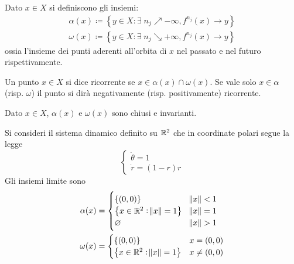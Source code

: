 \begin{definition}
    Dato $ x\in X $ si definiscono gli insiemi:
    \begin{align*}
        \alpha(x) \coloneqq \left\{ y\in X : \exists\; n_j \nearrow -\infty, f^{n_j}(x) \to y \right\} \\
        \omega(x) \coloneqq \left\{ y\in X : \exists\; n_j \searrow +\infty, f^{n_j}(x) \to y \right\}
    \end{align*}
    ossia l'insieme dei punti aderenti all'orbita di $ x $ nel passato e nel futuro rispettivamente.
\end{definition}

\begin{definition}
    Un punto $ x\in X $ si dice ricorrente se $ x\in \alpha(x) \cap \omega(x) $. Se vale solo $ x\in \alpha $ (risp. $ \omega $) il punto si dirà negativamente (risp. positivamente) ricorrente.
\end{definition}
\begin{exercise}
    Dato $ x\in X $, $ \alpha(x) $ e $ \omega(x) $ sono chiusi e invarianti.
\end{exercise}

\begin{example}
    Si consideri il sistema dinamico definito su $\mathbb{R}^2$ che in coordinate polari segue la legge
    \[
        \begin{cases}
            \dot{\theta}  = 1      \\
            \dot{r}       = (1-r)r
        \end{cases}
    \]
    Gli insiemi limite sono
    \begin{align*}
        \alpha(x) &=
        \begin{cases}
            \{ (0,0) \}                                & \norm{x} < 1 \\
            \left \{x \in \mathbb{R}^2: \norm{x} = 1 \right \} & \norm{x} = 1 \\
            \varnothing                                  & \norm{x} > 1
        \end{cases} \\
        \omega(x) &=
        \begin{cases}
            \{ (0,0) \} & x = (0,0) \\
            \left \{x \in \mathbb{R}^2: \norm{x} = 1 \right \} & x \neq (0,0)
        \end{cases}
    \end{align*}
\end{example}

